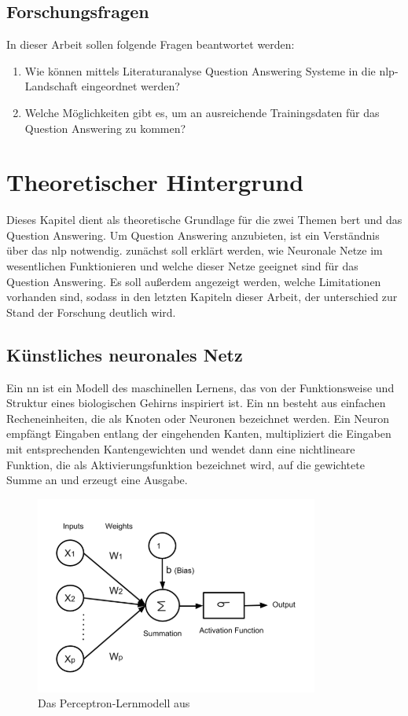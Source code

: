 \documentclass[
        ngerman,
        paper=a4,
        numbers=noendperiod,
]{scrreprt}
\begin{document}
\section{Forschungsfragen}

In dieser Arbeit sollen folgende Fragen beantwortet werden:
\begin{enumerate}
    \item Wie können mittels Literaturanalyse Question Answering Systeme in die \ac{nlp}-Landschaft eingeordnet werden?
    \item Welche Möglichkeiten gibt es, um an ausreichende Trainingsdaten für das Question Answering zu kommen?
\end{enumerate}


\chapter{Theoretischer Hintergrund}
Dieses Kapitel dient als theoretische Grundlage für die zwei Themen \ac{bert} und das Question Answering. Um Question Answering anzubieten, ist ein Verständnis über das \ac{nlp} notwendig. zunächst soll erklärt werden, wie Neuronale Netze im wesentlichen Funktionieren und welche dieser Netze geeignet sind für das Question Answering. Es soll außerdem angezeigt werden, welche Limitationen vorhanden sind, sodass in den letzten Kapiteln dieser Arbeit, der unterschied zur Stand der Forschung deutlich wird. 

\section{Künstliches neuronales Netz}
Ein  \ac{nn} ist ein Modell des maschinellen Lernens, das von der Funktionsweise und Struktur eines biologischen Gehirns inspiriert ist. Ein \ac{nn} besteht aus einfachen Recheneinheiten, die als Knoten oder Neuronen bezeichnet werden. Ein Neuron empfängt Eingaben entlang der eingehenden Kanten, multipliziert die Eingaben mit entsprechenden Kantengewichten und wendet dann eine nichtlineare Funktion, die als Aktivierungsfunktion bezeichnet wird, auf die gewichtete Summe an und erzeugt eine Ausgabe. 

\begin{figure}[H]
    \centering\includegraphics[width=.5\linewidth]{images/neur.png}
    \caption[Das Perceptron-Lernmodell]{Das Perceptron-Lernmodell aus \citep{Sengupta2019ATrends}}
    \label{fig:neu}
\end{figure}
\end{document}
